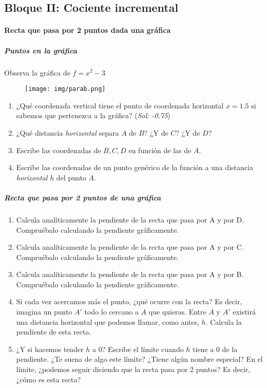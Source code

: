 \documentclass[palatino]{apuntesURJC}
\begin{document}
\newpage
\subsection{Bloque II: Cociente incremental}

\paragraph{Recta que pasa por 2 puntos dada una gráfica}

\subparagraph{Puntos en la gráfica}
Observa la gráfica de $f=x^2-3$
\begin{figure}[h]
\centering
\texttt{[image: img/parab.png]}
\end{figure}

\begin{enumerate}
	\item ¿Qué coordenada vertical tiene el punto de coordenada horizontal $x=1.5$ si sabemos que pertenezca a la gráfica? (\textit{Sol: -0.75})
	\item ¿Qué distancia \textit{horizontal} separa $A$ de $B$? ¿Y de $C$? ¿Y de $D$?
	\item Escribe las coordenadas de $B,C,D$ en función de las de $A$.
	\item Escribe las coordenadas de un punto genérico de la función a una distancia \textit{horizontal} $h$ del punto $A$.
\end{enumerate}


\subparagraph{Recta que pasa por 2 puntos de una gráfica}
\begin{enumerate}
	\item Calcula analíticamente la pendiente de la recta que pasa por A y por D. Compruébalo calculando la pendiente gráficamente.
	\item Calcula analíticamente la pendiente de la recta que pasa por A y por C. Compruébalo calculando la pendiente gráficamente.
	\item Calcula analíticamente la pendiente de la recta que pasa por A y por B. Compruébalo calculando la pendiente gráficamente.
	\item Si cada vez acercamos más el punto, ¿qué ocurre con la recta? Es decir, imagina un punto $A'$ todo lo cercano a $A$ que quieras. 
	Entre $A$ y $A'$ existirá una distancia horizontal que podemos llamar, como antes, $h$. Calcula la pendiente de esta recta.
	\item ¿Y si hacemos tender $h$ a 0? Escribe el límite cuando $h$ tiene a 0 de la pendiente. ¿Te suena de algo este límite? ¿Tiene algún nombre especial? 
	\subitem En el límite, ¿podemos seguir diciendo que la recta pasa por 2 puntos? Es decir, ¿cómo es esta recta? 
\end{enumerate}
\newpage
\end{document}
